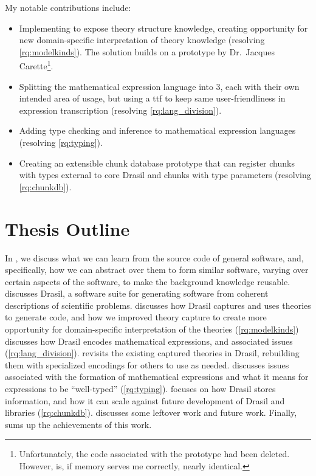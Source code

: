 My notable contributions include:

\begin{itemize}

      \item Implementing \ModelKinds{} to expose theory structure knowledge,
            creating opportunity for new domain-specific interpretation of
            theory knowledge (resolving \ref{rq:modelkinds}). The solution
            builds on a prototype by Dr.\ Jacques Carette\footnote{Unfortunately,
                  the code associated with the prototype had been deleted. However,
                   is, if memory serves me
                  correctly, nearly identical.}.

      \item Splitting the mathematical expression language into 3, each with
            their own intended area of usage, but using a \acs{ttf}
            \cite{Carette2009} to keep same user-friendliness in expression
            transcription (resolving \ref{rq:lang_division}).

      \item Adding type checking and inference to mathematical expression
            languages (resolving \ref{rq:typing}).

      \item Creating an extensible chunk database prototype that can register
            chunks with types external to core Drasil and chunks with type
            parameters (resolving \ref{rq:chunkdb}).

\end{itemize}

\section{Thesis Outline}
\label{chap:intro:sec:thesis-outline}

In , we discuss what we can learn from the source code of
general software, and, specifically, how we can abstract over them to form
similar software, varying over certain aspects of the software, to make the
background knowledge reusable.  discusses Drasil, a software
suite for generating software from coherent descriptions of scientific problems.
 discusses how Drasil captures and uses theories to
generate code, and how we improved theory capture to create more opportunity for
domain-specific interpretation of the theories (\ref{rq:modelkinds})
 discusses how Drasil encodes mathematical expressions,
and associated issues (\ref{rq:lang_division}). 
revisits the existing captured theories in Drasil, rebuilding them with
specialized encodings for others to use as needed. 
discusses issues associated with the formation of mathematical expressions and
what it means for expressions to be ``well-typed'' (\ref{rq:typing}).
 focuses on how Drasil stores information, and how it
can scale against future development of Drasil and libraries (\ref{rq:chunkdb}).
 discusses some leftover work and future work. Finally,
 sums up the achievements of this work.
